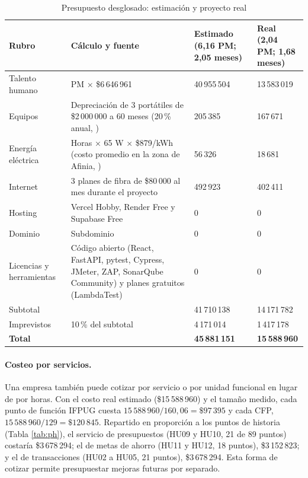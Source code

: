 \begin{table}[H]
\caption{Presupuesto desglosado: estimación y proyecto real}
\label{tab:presupuesto}
\footnotesize
\begin{tabularx}{\linewidth}{L{2.4cm} Y L{2.1cm} L{2.1cm}}
\toprule
Rubro & Cálculo y fuente & Estimado (6,16 PM; 2,05 meses) & Real (2,04 PM; 1,68 meses) \\
\midrule
Talento humano & PM × \$6\,646\,961 & 40\,955\,504 & 13\,583\,019 \\
Equipos & Depreciación de 3 portátiles de \$2\,000\,000 \parencite{portafolio_portatiles} a 60 meses (20\,\% anual, \cite{estatuto137}) & 205\,385 & 167\,671 \\
Energía eléctrica & Horas × 65 W × \$879/kWh (costo promedio en la zona de Afinia, \cite{rtvc2026}) & 56\,326 & 18\,681 \\
Internet & 3 planes de fibra de \$80\,000 al mes \parencite{cuantomecuesta2026} durante el proyecto & 492\,923 & 402\,411 \\
Hosting & Vercel Hobby, Render Free y Supabase Free \parencite{vercel2026,render2026,supabase2026} & 0 & 0 \\
Dominio & Subdominio  & 0 & 0 \\
Licencias y herramientas & Código abierto (React, FastAPI, pytest, Cypress, JMeter, ZAP, SonarQube Community) y planes gratuitos (LambdaTest) & 0 & 0 \\
\midrule
Subtotal & & 41\,710\,138 & 14\,171\,782 \\
Imprevistos & 10\,\% del subtotal & 4\,171\,014 & 1\,417\,178 \\
\midrule
\textbf{Total} & & \textbf{45\,881\,151} & \textbf{15\,588\,960} \\
\bottomrule
\end{tabularx}
\end{table}

\paragraph{Costeo por servicios.} Una empresa también puede cotizar por servicio o por unidad funcional en lugar de por horas. Con el costo real estimado (\$15\,588\,960) y el tamaño medido, cada punto de función IFPUG cuesta $15\,588\,960 / 160{,}06 = \$97\,395$ y cada CFP, $15\,588\,960 / 129 = \$120\,845$. Repartido en proporción a los puntos de historia (Tabla \ref{tab:ph}), el servicio de presupuestos (HU09 y HU10, 21 de 89 puntos) costaría \$3\,678\,294; el de metas de ahorro (HU11 y HU12, 18 puntos), \$3\,152\,823; y el de transacciones (HU02 a HU05, 21 puntos), \$3\,678\,294. Esta forma de cotizar permite presupuestar mejoras futuras por separado.


